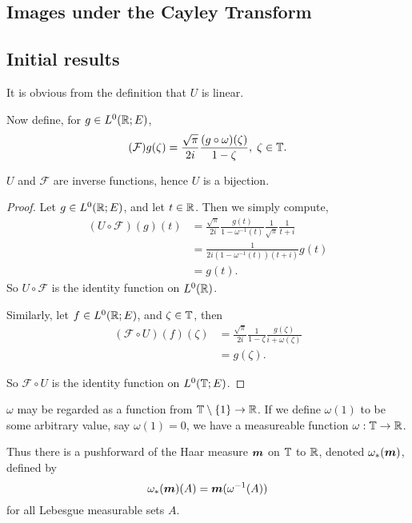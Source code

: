 \subsection{Images under the Cayley Transform}

\subsection{Initial results}
It is obvious from the definition that $U$ is linear. 

Now define, for $g \in L^0(\mathbb{R};E)$,
\begin{equation*}
    (\mathcal{F})g(\zeta) = \frac{\sqrt{\pi}}{2i}\frac{(g\circ \omega)(\zeta)}{1-\zeta},\;\zeta\in\mathbb{T}.
\end{equation*}

\begin{lemma}
    $U$ and $\mathcal{F}$ are inverse functions, hence $U$ is a bijection.
\end{lemma}
\begin{proof}
    Let $g \in L^0(\mathbb{R};E)$, and let $t \in \mathbb{R}$. Then we simply compute,
    \begin{align*}
        (U\circ\mathcal{F})(g)(t) &= \frac{\sqrt{\pi}}{2i}\frac{g(t)}{1-\omega^{-1}(t)} \frac{1}{\sqrt{\pi}}\frac{1}{t+i}\\
        &= \frac{1}{2i(1-\omega^{-1}(t))(t+i)}g(t)\\
        &= g(t).
    \end{align*}
    So $U\circ \mathcal{F}$ is the identity function on $L^0(\mathbb{R})$.
    
    Similarly, let $f \in L^0(\mathbb{R};E)$, and $\zeta \in \mathbb{T}$, then
    \begin{align*}
        (\mathcal{F}\circ U)(f)(\zeta) &= \frac{\sqrt{\pi}}{2i}\frac{1}{1-\zeta}\frac{g(\zeta)}{i+\omega(\zeta)}\\
        &= g(\zeta).
    \end{align*}
    
    So $\mathcal{F}\circ U$ is the identity function on $L^0(\mathbb{T};E)$.
\end{proof}

$\omega$ may be regarded as a function from $\mathbb{T}\setminus\{1\}\rightarrow \mathbb{R}$. 
If we define $\omega(1)$ to be some arbitrary value, say $\omega(1) = 0$, we
have a measureable function $\omega:\mathbb{T}\rightarrow\mathbb{R}$.

Thus there is a pushforward of the Haar measure $\boldsymbol{m}$ on $\mathbb{T}$
to $\mathbb{R}$, denoted $\omega_*(\boldsymbol{m})$, defined
by
\begin{equation*}
    \omega_*(\boldsymbol{m})(A) = \boldsymbol{m}(\omega^{-1}(A))    
\end{equation*}
for all Lebesgue measurable sets $A$.


